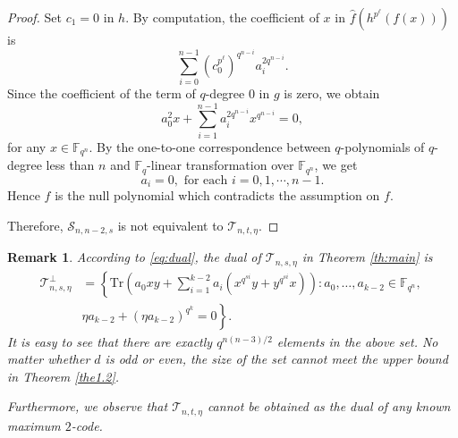 \documentclass{amsart}
\theoremstyle{plain}
\newtheorem{remark}[theorem]{Remark}
\theoremstyle{definition}
\newcommand{\F}{\mathbb F}
\newcommand{\fqn}{\mathbb{F}_{q^n}}
\newcommand{\cS}{\mathcal S}
\newcommand{\cT}{\mathcal{T}}
\begin{document}
\begin{proof}
		Set $c_1=0$ in $h$. By computation, the coefficient of $x$ in  $\hat{f}\left(h^{p^\ell} (f(x))\right)$ is
		\[\sum_{i=0}^{n-1}(c_0^{p^\ell})^{q^{n-i}}a_i^{2q^{n-i}}.\]
		Since the coefficient of the term of $q$-degree $0$ in $g$ is zero, we obtain
		$$a_0^2x + \sum_{i=1}^{n-1}a_i^{2q^{n-i}}x^{q^{n-i}} = 0,$$
		for any $x\in\fqn$. By the one-to-one correspondence between $q$-polynomials of $q$-degree less than $n$ and $\F_q$-linear transformation over $\fqn$, we get
		\begin{equation}\label{eq_2_3}
			a_i=0, \text{ for each }i=0,1,\cdots,n-1.
		\end{equation}
		Hence $f$ is the null polynomial which contradicts the assumption on $f$.
		
		Therefore, $\cS_{n,n-2,s}$ is not equivalent to $\cT_{n,t,\eta}$.
	\end{proof}

		\begin{remark}
			According to \eqref{eq:dual}, the dual of \(\mathcal{T}_{n,s,\eta}\) in Theorem \ref{th:main} is
			\begin{align*}
				\mathcal{T}_{n,s,\eta}^\perp& = 
				\left\{ \mathrm{Tr}\left(a_0xy+\sum_{i=1}^{k-2}a_i\left(x^{q^{si}}y+y^{q^{si}}x\right)\right): 
				a_0,\dots,a_{k-2}\in\mathbb{F}_{q^n},\;  \right.\\ 	&\left.	\eta a_{k-2}+(\eta a_{k-2})^{q^k}=0 \right\}.
			\end{align*}				
			It is easy to see that there are exactly $q^{n(n-3)/2}$ elements in the above set.  No matter whether $d$ is odd or even, the size of the set cannot meet the upper bound in Theorem \ref{the1.2}.
			
			Furthermore, we observe that $\mathcal{T}_{n,t,\eta}$ cannot be obtained as the dual of any known maximum $2$-code.
	\end{remark}
	
\end{document}
